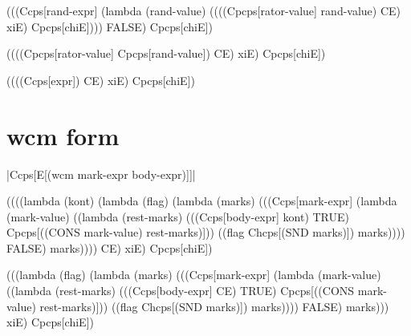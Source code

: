 \begin{schemeblock}
\begin{schemedisplay}
(((Ccps[rand-expr]
       (lambda (rand-value)
         ((((Cpcps[rator-value] rand-value) CE) xiE) Cpcps[chiE])))
  FALSE) Cpcps[chiE])
\end{schemedisplay}
\end{schemeblock}

\begin{schemeblock}
\begin{schemedisplay}
((((Cpcps[rator-value] Cpcps[rand-value]) CE) xiE) Cpcps[chiE])
\end{schemedisplay}
\end{schemeblock}

\begin{schemeblock}
\begin{schemedisplay}
((((Ccps[expr]) CE) xiE) Cpcps[chiE])
\end{schemedisplay}
\end{schemeblock}

\section{wcm form}

\noindent
\scheme|Ccps[E[(wcm mark-expr body-expr)]]|
\begin{schemeblock}
\begin{schemedisplay}
((((lambda (kont)
     (lambda (flag)
       (lambda (marks)
         (((Ccps[mark-expr]
                (lambda (mark-value) 
                  ((lambda (rest-marks) 
                     (((Ccps[body-expr] kont) TRUE) Cpcps[((CONS mark-value) rest-marks)]))
                   ((flag Chcps[(SND marks)]) marks))))
           FALSE) marks))))
   CE) xiE) Cpcps[chiE])
\end{schemedisplay}
\end{schemeblock}

\begin{schemeblock}
\begin{schemedisplay}
(((lambda (flag)
    (lambda (marks)
      (((Ccps[mark-expr]
             (lambda (mark-value) 
               ((lambda (rest-marks) 
                  (((Ccps[body-expr] CE) TRUE) Cpcps[((CONS mark-value) rest-marks)]))
                ((flag Chcps[(SND marks)]) marks))))
        FALSE) marks)))
  xiE) Cpcps[chiE])
\end{schemedisplay}
\end{schemeblock}

